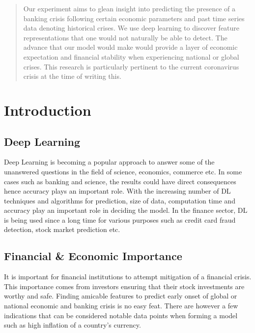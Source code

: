 \documentclass[12pt]{article}
\begin{document}
\maketitle

\begin{abstract}
Our experiment aims to glean insight into predicting the presence of a banking crisis following certain economic parameters and past time series data denoting historical crises. We use deep learning to discover feature representations that one would not naturally be able to detect. The advance that our model would make would provide a layer of economic expectation and financial stability when experiencing national or global crises. This research is particularly pertinent to the current coronavirus crisis at the time of writing this.
\end{abstract}


\section{Introduction}

\subsection{Deep Learning}

Deep Learning is becoming a popular approach to answer some of the unanswered questions in the field of science, economics, commerce etc. In some cases such as banking and science, the results could have direct consequences hence accuracy plays an important role. With the increasing number of DL techniques and algorithms for prediction, size of data, computation time and accuracy play an important role in deciding the model. In the finance sector, DL is being used since a long time for various purposes such as credit card fraud detection, stock market prediction etc. 

\subsection{Financial \& Economic Importance}

It is important for financial institutions to attempt mitigation of a financial crisis.  This importance comes from investors ensuring that their stock investments are worthy and safe. Finding amicable features to predict early onset of global or national economic and banking crisis is no easy feat. There are however a few indications that can be considered notable data points when forming a model such as high inflation of a country's currency\cite{kumar}. 
\end{document}
